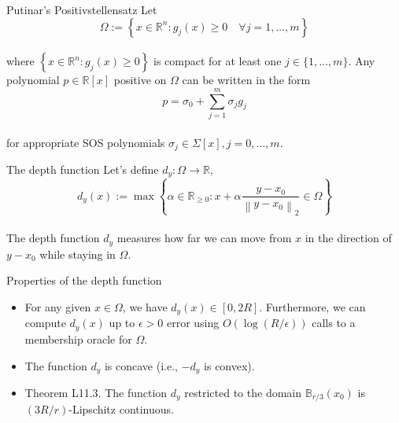 \begin{theorem}[L10.4]{Putinar's Positivstellensatz}
    Let
    \vspace{-4pt}\\
    $$
    \Omega:=\left\{x \in \mathbb{R}^n: g_j(x) \geq 0 \quad \forall j=1, \ldots, m\right\}
    $$
    \vspace{-4pt}\\
    where $\left\{x \in \mathbb{R}^n: g_j(x) \geq 0\right\}$ is compact for at least one $j \in\{1, \ldots, m\}$. Any polynomial $p \in \mathbb{R}[x]$ positive on $\Omega$ can be written in the form
    \vspace{-4pt}\\
    $$
    p=\sigma_0+\sum_{j=1}^m \sigma_j g_j
    $$
    \vspace{-4pt}\\
    for appropriate SOS polynomials $\sigma_j \in \Sigma[x], j=0, \ldots, m$.
\end{theorem}


\begin{definition}[L11.X]{The depth function}
    Let's define $d_y: \Omega \rightarrow \mathbb{R}$,
    \vspace{-4pt}\\
    $$
    d_y(x):=\max \left\{\alpha \in \mathbb{R}_{\geq 0}: x+\alpha \frac{y-x_0}{\left\|y-x_0\right\|_2} \in \Omega\right\}
    $$
    \vspace{-4pt}\\
    The depth function $d_y$ measures how far we can move from $x$ in the direction of $y-x_0$ while staying in $\Omega$.
\end{definition}

\begin{theorem}[L11.1-3]{Properties of the depth function}
    \begin{itemize}[leftmargin=*]
        \item For any given $x \in \Omega$, we have $d_y(x) \in[0,2 R]$. Furthermore, we can compute $d_y(x)$ up to $\epsilon>0$ error using $O(\log (R / \epsilon))$ calls to a membership oracle for $\Omega$.
        \item The function $d_y$ is concave (i.e., $-d_y$ is convex).
        \item Theorem L11.3. The function $d_y$ restricted to the domain $\mathbb{B}_{r / 3}\left(x_0\right)$ is $(3 R / r)$-Lipschitz continuous.
    \end{itemize}
\end{theorem}

